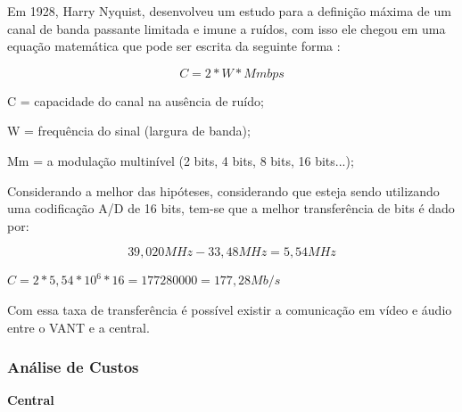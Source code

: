 

Em 1928, Harry Nyquist, desenvolveu um estudo para a definição máxima de um canal de banda passante limitada e imune a ruídos, 
com isso ele chegou em  uma equação matemática que pode ser escrita da seguinte forma \cite{semente}:

\begin{equation}
 C = 2*W*Mm bps
\end{equation}

\indent C = capacidade do canal na ausência de ruído;

\indent W = frequência do sinal (largura de banda);

\indent Mm = a modulação multinível (2 bits, 4 bits, 8 bits, 16 bits...);

Considerando a melhor das hipóteses, considerando que esteja sendo utilizando uma codificação A/D de 16 bits, 
tem-se que a melhor transferência de bits é dado por: 

\begin{equation}
 39,020 MHz-33,48MHz=5,54MHz
\end{equation}

\begin{center}
 $C = 2*5,54* {10} ^ {6} *16=177280000=177,28 Mb/s$
\end{center}

Com essa taxa de transferência é possível existir a comunicação em vídeo e áudio entre o VANT e a central. 

\subsubsection{Análise de Custos}

\indent \textbf{Central}

